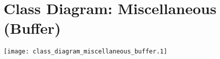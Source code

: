 \section{Class Diagram: Miscellaneous (Buffer)}
\texttt{[image: class\_diagram\_miscellaneous\_buffer.1]} 